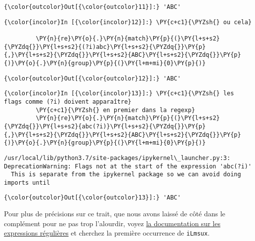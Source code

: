 \begin{Verbatim}[commandchars=\\\{\}]
{\color{outcolor}Out[{\color{outcolor}11}]:} 'ABC'
\end{Verbatim}
            
    \begin{Verbatim}[commandchars=\\\{\}]
{\color{incolor}In [{\color{incolor}12}]:} \PY{c+c1}{\PYZsh{} ou cela}
         
         \PY{n}{re}\PY{o}{.}\PY{n}{match}\PY{p}{(}\PY{l+s+s2}{\PYZdq{}}\PY{l+s+s2}{(?i)abc}\PY{l+s+s2}{\PYZdq{}}\PY{p}{,}\PY{l+s+s2}{\PYZdq{}}\PY{l+s+s2}{ABC}\PY{l+s+s2}{\PYZdq{}}\PY{p}{)}\PY{o}{.}\PY{n}{group}\PY{p}{(}\PY{l+m+mi}{0}\PY{p}{)}
\end{Verbatim}


\begin{Verbatim}[commandchars=\\\{\}]
{\color{outcolor}Out[{\color{outcolor}12}]:} 'ABC'
\end{Verbatim}
            
    \begin{Verbatim}[commandchars=\\\{\}]
{\color{incolor}In [{\color{incolor}13}]:} \PY{c+c1}{\PYZsh{} les flags comme (?i) doivent apparaître}
         \PY{c+c1}{\PYZsh{} en premier dans la regexp}
         \PY{n}{re}\PY{o}{.}\PY{n}{match}\PY{p}{(}\PY{l+s+s2}{\PYZdq{}}\PY{l+s+s2}{abc(?i)}\PY{l+s+s2}{\PYZdq{}}\PY{p}{,}\PY{l+s+s2}{\PYZdq{}}\PY{l+s+s2}{ABC}\PY{l+s+s2}{\PYZdq{}}\PY{p}{)}\PY{o}{.}\PY{n}{group}\PY{p}{(}\PY{l+m+mi}{0}\PY{p}{)}
\end{Verbatim}


    \begin{Verbatim}[commandchars=\\\{\}]
/usr/local/lib/python3.7/site-packages/ipykernel\_launcher.py:3: DeprecationWarning: Flags not at the start of the expression 'abc(?i)'
  This is separate from the ipykernel package so we can avoid doing imports until

    \end{Verbatim}

\begin{Verbatim}[commandchars=\\\{\}]
{\color{outcolor}Out[{\color{outcolor}13}]:} 'ABC'
\end{Verbatim}
            
    Pour plus de précisions sur ce trait, que nous avons laissé de côté dans
le complément pour ne pas trop l'alourdir, voyez
\href{https://docs.python.org/3/library/re.html\#regular-expression-syntax}{la
documentation sur les expressions régulières} et cherchez la première
occurrence de \texttt{iLmsux}.

